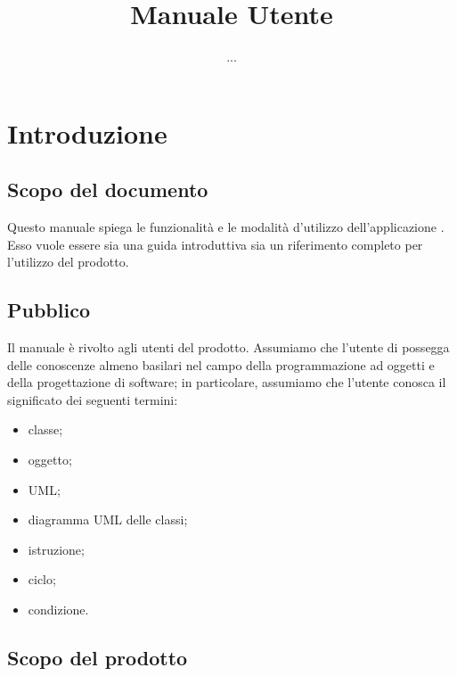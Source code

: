 


\author{...}
\title{Manuale Utente}


\maketitle

\tableofcontents






\section{Introduzione}

\subsection{Scopo del documento}
Questo manuale spiega le funzionalità e le modalità d'utilizzo dell'applicazione \proj. Esso vuole essere sia una guida introduttiva sia un riferimento completo per l'utilizzo del prodotto.

\subsection{Pubblico}
Il manuale è rivolto agli utenti del prodotto. Assumiamo che l'utente di \proj{} possegga delle conoscenze almeno basilari nel campo della programmazione ad oggetti e della progettazione di software; in particolare, assumiamo che l'utente conosca il significato dei seguenti termini:
\begin{itemize}
	\item classe;
	\item oggetto;
	\item UML;
	\item diagramma UML delle classi;
	\item istruzione;
	\item ciclo;
	\item condizione.
\end{itemize}

\subsection{Scopo del prodotto}
\scopo

